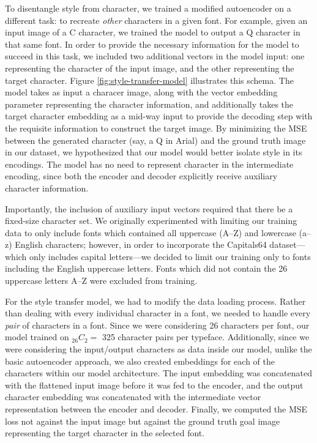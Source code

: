 To disentangle style from character, we trained a modified autoencoder on a different task: to recreate \textit{other} characters in a given font. For example, given an input image of a C character, we trained the model to output a Q character in that same font. In order to provide the necessary information for the model to succeed in this task, we included two additional vectors in the model input: one representing the character of the input image, and the other representing the target character. Figure \ref{fig:style-transfer-model} illustrates this schema. The model takes as input a characer image, along with the vector embedding parameter representing the character information, and additionally takes the target character embedding as a mid-way input to provide the decoding step with the requisite information to construct the target image. By minimizing the MSE between the generated character (say, a { Q} in Arial) and the ground truth image in our dataset, we hypothesized that our model would better isolate style in its encodings. The model has no need to represent character in the intermediate encoding, since both the encoder and decoder explicitly receive auxiliary character information. 

Importantly, the inclusion of auxiliary input vectors required that there be a fixed-size character set. We originally experimented with limiting our training data to only include fonts which contained all uppercase (A--Z) and lowercase (a--z) English characters; however, in order to incorporate the Capitals64 dataset---which only includes capital letters---we decided to limit our training only to fonts including the English uppercase letters. Fonts which did not contain the 26 uppercase letters A--Z were excluded from training.

For the style transfer model, we had to modify the data loading process. Rather than dealing with every individual character in a font, we needed to handle every \textit{pair} of characters in a font. Since we were considering 26 characters per font, our model trained on ${}_{26}C_2 =$ 325 character pairs per typeface. Additionally, since we were considering the input/output characters as data inside our model, unlike the basic autoencoder approach, we also created embeddings for each of the characters within our model architecture. The input embedding was concatenated with the flattened input image before it was fed to the encoder, and the output character embedding was concatenated with the intermediate vector representation between the encoder and decoder. Finally, we computed the MSE loss not against the input image but against the ground truth goal image representing the target character in the selected font.

